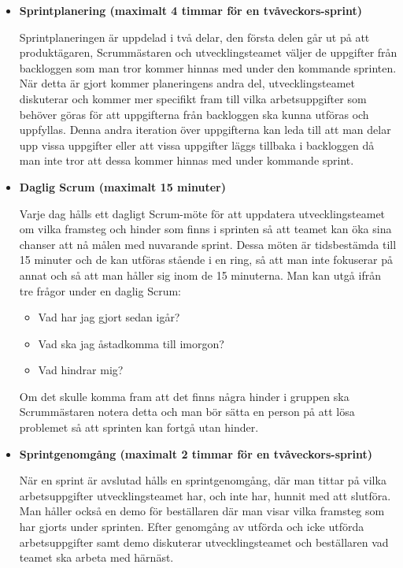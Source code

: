 \begin{itemize}
	\item \textbf{Sprintplanering (maximalt 4 timmar för en tvåveckors-sprint)}
	
	Sprintplaneringen är uppdelad i två delar, den första delen går ut på att produktägaren, Scrummästaren och utvecklingsteamet väljer de uppgifter från backloggen som man tror kommer hinnas med under den kommande sprinten. När detta är gjort kommer planeringens andra del, utvecklingsteamet diskuterar och kommer mer specifikt fram till vilka arbetsuppgifter som behöver göras för att uppgifterna från backloggen ska kunna utföras och uppfyllas. Denna andra iteration över uppgifterna kan leda till att man delar upp vissa uppgifter eller att vissa uppgifter läggs tillbaka i backloggen då man inte tror att dessa kommer hinnas med under kommande sprint.
	
	\item \textbf{Daglig Scrum (maximalt 15 minuter)}
	
	Varje dag hålls ett dagligt Scrum-möte för att uppdatera utvecklingsteamet om vilka framsteg och hinder som finns i sprinten så att teamet kan öka sina chanser att nå målen med nuvarande sprint. Dessa möten är tidsbestämda till 15 minuter och de kan utföras stående i en ring, så att man inte fokuserar på annat och så att man håller sig inom de 15 minuterna. Man kan utgå ifrån tre frågor under en daglig Scrum:
	
	\begin{itemize}
		\item Vad har jag gjort sedan igår?
		\item Vad ska jag åstadkomma till imorgon?
		\item Vad hindrar mig?
	\end{itemize}
	
	Om det skulle komma fram att det finns några hinder i gruppen ska Scrummästaren notera detta och man bör sätta en person på att lösa problemet så att sprinten kan fortgå utan hinder.
	
	\item \textbf{Sprintgenomgång (maximalt 2 timmar för en tvåveckors-sprint)}
	
	När en sprint är avslutad hålls en sprintgenomgång, där man tittar på vilka arbetsuppgifter utvecklingsteamet har, och inte har, hunnit med att slutföra. Man håller också en demo för beställaren där man visar vilka framsteg som har gjorts under sprinten. Efter genomgång av utförda och icke utförda arbetsuppgifter samt demo diskuterar utvecklingsteamet och beställaren vad teamet ska arbeta med härnäst.
	 

\end{itemize}
